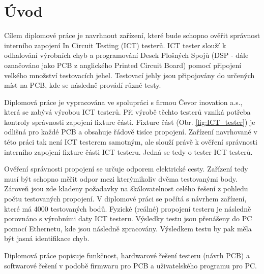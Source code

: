 \chapter*{Úvod}
{}

\indent Cílem diplomové práce je navrhnout zařízení,
které bude schopno ověřit správnost interního zapojení In Circuit Testing (ICT) testerů.
ICT tester slouží k odhalování výrobních chyb a programování Desek Plošných Spojů (DSP - dále
označováno jako PCB z anglického Printed Circuit Board)
pomocí připojení velkého množství testovacích jehel. Testovací jehly jsou připojovány do určených
míst na PCB, kde se následně provádí různé testy.\par

Diplomová práce je vypracována ve spolupráci s firmou Čevor inovation a.s.,
která se zabývá výrobou ICT testerů. Při výrobě těchto testerů vzniká potřeba kontroly správnosti zapojení fixture části.
Fixture část (Obr. \ref{fig:ICT_tester}) je odlišná pro každé PCB a obsahuje řádově tisíce propojení.
Zařízení navrhované v této práci tak není ICT testerem samotným,
ale slouží právě k ověření správnosti interního zapojení fixture části ICT testeru.
Jedná se tedy o tester ICT testerů.\par

Ověření správnosti propojení se určuje odporem elektrické cesty.
Zařízení tedy musí být schopno měřit odpor mezi kterýmikoliv dvěma testovanými body.
Zároveň jsou zde kladeny požadavky na škálovatelnost celého řešení z pohledu počtu testovaných propojení.
V diplomové práci se počítá s návrhem zařízení, které má 4000 testovaných bodů.
Fyzické (reálné) propojení testeru je následně porovnáno s výrobními daty ICT testeru.
Výsledky testu jsou přenášeny do PC pomocí Ethernetu,
kde jsou následně zpracovány. Výsledkem testu by pak měla být jasná identifikace chyb.\par

Diplomová práce popisuje funkčnost, hardwarové řešení testeru (návrh PCB) a softwarové řešení v
podobě firmwaru pro PCB a uživatelského programu pro PC. 